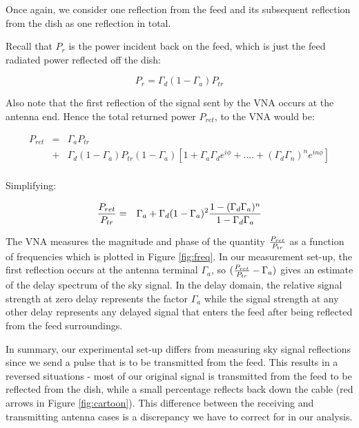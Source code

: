 \documentclass[12pt,preprint]{aastex}
\begin{document}
Once again, we consider one reflection from the feed and its subsequent reflection from the dish as one reflection in total.

Recall that $P_{r}$ is the power incident back on the feed, which is just the feed radiated power reflected off the dish:
 
\begin{equation}
P_{r}= \Gamma_{d}(1-\Gamma_a) P_{tr}
\end{equation}

Also note that the first reflection of the signal sent by the VNA occurs at the antenna end. Hence the total returned power $P_{ret}$, to the VNA  would be:

\begin{eqnarray}
P_{ret} & = & \Gamma_{a}P_{tr} \nonumber\\ 
 & + &   \Gamma_{d}(1-\Gamma_a) P_{tr}(1-\Gamma_{a}) [1+ \Gamma_{a}\Gamma_{d} e^{i\phi}+  ....+ (\Gamma_{d}\Gamma_{n})^{n}e^{in\phi}]\nonumber\\
 \end{eqnarray}
 
Simplifying:
 
  \begin{eqnarray}
 {P_{ret} \over P_{tr} } & = & \Gamma_{a}
  +  \Gamma_{d}(1-\Gamma_a)^{2}  {1-(\Gamma_{d}\Gamma_{a})^{n} \over 1-\Gamma_{d} \Gamma_{a} } \nonumber\\
\end{eqnarray}

The VNA measures the magnitude and phase of the quantity ${P_{ret}\over P_{tr}}$ as a function of frequencies which is plotted in Figure \ref{fig:freq}. In our measurement set-up, the first reflection occurs at the antenna terminal $\Gamma_{a}$, so $({P_{ret} \over P_{tr} }  - \Gamma_{a}) $ gives an estimate of the delay spectrum of the sky signal. In the delay domain, the relative signal strength at zero delay represents the factor $\Gamma_{a}$ while the signal strength at any other delay represents any delayed signal that enters the feed after being reflected from the feed surroundings. 

In summary, our experimental set-up differs from measuring sky signal reflections since we send a pulse that is to be transmitted from the feed. This results in a reversed situations - most of our original signal is transmitted from the feed to be reflected from the dish, while a small percentage reflects back down the cable (red arrows in Figure \ref{fig:cartoon}). This difference between the receiving and transmitting antenna cases is a discrepancy we have to correct for in our analysis.
\end{document}
